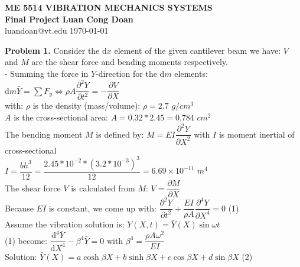 \documentclass[14pt,a4paper]{article}
\begin{document}
\label{cover}
\begin{center}
	\vspace*{3cm}
	\large{\textbf{ME 5514 VIBRATION MECHANICS SYSTEMS \\ Final Project}}
	\vfill
	\textbf{Luan Cong Doan} \\ luandoan@vt.edu
	\vfill
	\today
\end{center}
\pagebreak

\label{Answer Sheet}
\label{Vibration Mechanics _ Final Project}
\doublespacing
\textbf{Problem 1.} Consider the $\mathrm{d}x$ element of the given cantilever beam we have: $V$ and $M$ are the shear force and bending moments respectively.\\
- Summing the force in $Y$-direction for the $\mathrm{d}m$ elements:\\
\hspace*{5cm} $\mathrm{d}m\bar{Y} = \sum F_y \Leftrightarrow \rho A\dfrac{\partial^2Y}{\partial t^2} = -\dfrac{\partial V}{\partial X} $\\
with: $\rho$ is the density (mass/volume): $\rho = 2.7$  $g/cm^3$ \\
\hspace*{0.8cm} $A$ is the cross-sectional area: $A = 0.32*2.45 = 0.784$ $cm^2$ \\
The bending moment $M$ is defined by: $M = EI\dfrac{\partial^2Y}{\partial X^2}$ with $I$ is moment inertial of cross-sectional\\
\hspace*{1cm}	$I = \dfrac{bh^3}{12} = \dfrac{2.45*10^{-2}*(3.2*10^{-3})^3}{12} = 6.69\times 10^{-11}$ $m^4$\\
The shear force $V$ is calculated from $M$: $V = \dfrac{\partial M}{\partial X} $\\
Because $EI$ is constant, we come up with: $\dfrac{\partial^2Y}{\partial t^2} + \dfrac{EI}{\rho A}\dfrac{\partial^4Y}{\partial X^4} = 0$ \hspace{2cm} (1)\\
Assume the vibration solution is: $Y(X,t) = \bar{Y}(X)\sin\omega t$\\
(1) become: $\dfrac{\mathrm{d}^4\bar{Y}}{\mathrm{d}X^4} - \beta^4\bar{Y} = 0$ \hspace{2cm} with $ \beta^4 = \dfrac{\rho A\omega^2}{EI}$\\
Solution: $\bar{Y}(X) = a\cosh \beta X + b\sinh \beta X + c\cos \beta X + d\sin \beta X $ \hspace{2cm} (2)
\end{document}
